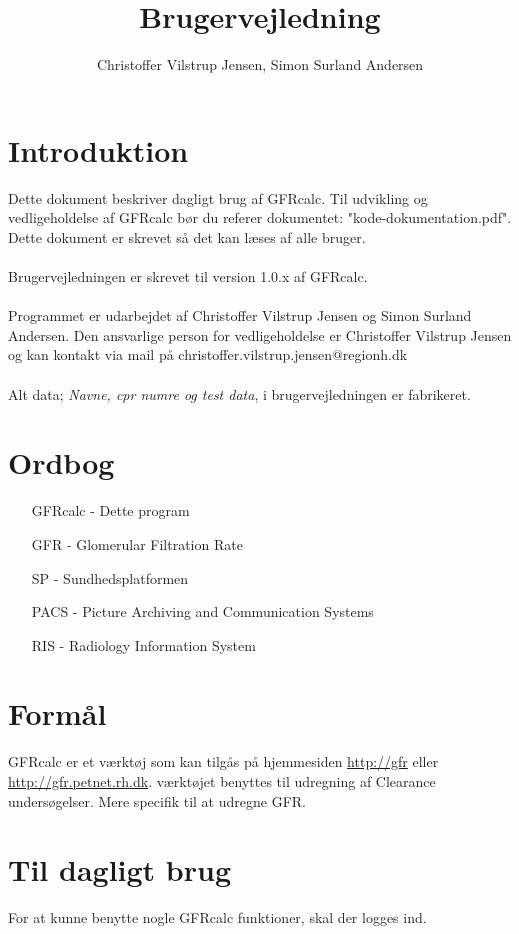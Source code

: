 \documentclass{article}
\author{Christoffer Vilstrup Jensen, Simon Surland Andersen}
\title{Brugervejledning}
\begin{document}
\tableofcontents
\section*{Introduktion}
Dette dokument beskriver dagligt brug af GFRcalc. Til udvikling og vedligeholdelse af GFRcalc bør du referer dokumentet: "kode-dokumentation.pdf". Dette dokument er skrevet så det kan læses af alle bruger.\\\\
Brugervejledningen er skrevet til version 1.0.x af GFRcalc.\\\\
Programmet er udarbejdet af Christoffer Vilstrup Jensen og Simon Surland Andersen. Den ansvarlige person for vedligeholdelse er Christoffer Vilstrup Jensen og kan kontakt via mail på christoffer.vilstrup.jensen@regionh.dk\\\\
Alt data; \textit{Navne, cpr numre og test data}, i brugervejledningen er fabrikeret.

\section*{Ordbog}
\begin{itemize}
	\item[GFRcalc] 	- Dette program
	\item[GFR]     	- Glomerular Filtration Rate
	\item[SP]      	- Sundhedsplatformen
	\item[PACS]	   	- Picture Archiving and Communication Systems
	\item[RIS]		- Radiology Information System
\end{itemize}
\section*{Formål}
GFRcalc er et værktøj som kan tilgås på hjemmesiden \url{http://gfr} eller \url{http://gfr.petnet.rh.dk}. værktøjet benyttes til udregning af Clearance undersøgelser. Mere specifik til at udregne GFR. 
\newpage
\section{Til dagligt brug}
For at kunne benytte nogle GFRcalc funktioner, skal der logges ind.
\end{document}
